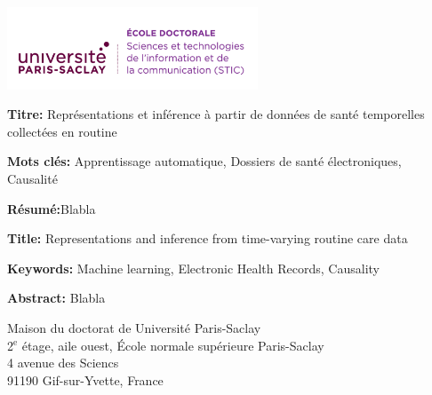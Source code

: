 \documentclass[french,12pt,twoside,a4paper]{book}
\begin{document}
\clearpage
%
%
%
\begin{multicols}{2}
  \printbibliography
\end{multicols}


\ifthispageodd{\newpage\thispagestyle{empty}\null\newpage}{}
\thispagestyle{empty}
\selectfont

\lhead{}
\rhead{}
\rfoot{}
\cfoot{}
\lfoot{}

\noindent
\includegraphics[height=2.45cm]{img/EOBE}
\vspace{1cm}
\selectfont

\small

\begin{mdframed}[linecolor=Prune,linewidth=1]

  \textbf{Titre:} Représentations et inférence à partir de données de santé temporelles collectées en routine


  \noindent \textbf{Mots clés:} Apprentissage automatique, Dossiers de santé
  électroniques, Causalité

  \vspace{-.5cm}
  \begin{multicols}{2}
    \noindent \textbf{Résumé:}Blabla
  \end{multicols}

\end{mdframed}

\begin{mdframed}[linecolor=Prune,linewidth=1]

  \textbf{Title:} Representations and inference from time-varying routine care data

  \noindent \textbf{Keywords:} Machine learning, Electronic Health Records, Causality

  \begin{multicols}{2}
    \noindent \textbf{Abstract:} Blabla
  \end{multicols}
\end{mdframed}

\vspace{\fill} %

\noindent
\color{Prune} \footnotesize Maison du doctorat de Université Paris-Saclay\\
2$^{\mathrm{e}}$ étage, aile ouest, École normale supérieure Paris-Saclay\\
4 avenue des Sciencs\\
91190 Gif-sur-Yvette, France
\end{document}
